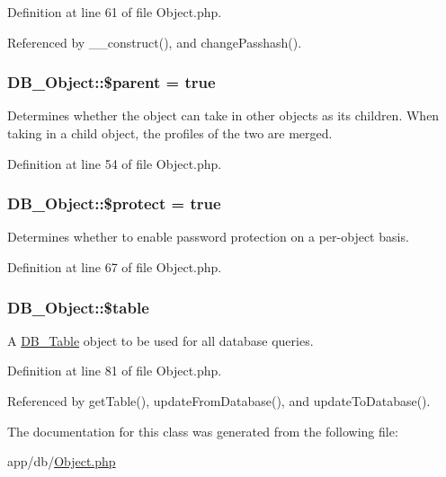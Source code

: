 Definition at line 61 of file Object.php.

Referenced by \_\-\_\-construct(), and changePasshash().\hypertarget{classDB__Object_abc24dbdab0d6a65f2f775ae46d0c4a59}{
\subsubsection[{\$parent}]{\setlength{\rightskip}{0pt plus 5cm}DB\_\-Object::\$parent = true}}
\label{dc/d6d/classDB__Object_abc24dbdab0d6a65f2f775ae46d0c4a59}
Determines whether the object can take in other objects as its children. When taking in a child object, the profiles of the two are merged. 

Definition at line 54 of file Object.php.\hypertarget{classDB__Object_ae7ffc7d66d72066f8333048851ef6926}{
\subsubsection[{\$protect}]{\setlength{\rightskip}{0pt plus 5cm}DB\_\-Object::\$protect = true}}
\label{dc/d6d/classDB__Object_ae7ffc7d66d72066f8333048851ef6926}
Determines whether to enable password protection on a per-\/object basis. 

Definition at line 67 of file Object.php.\hypertarget{classDB__Object_a0d08820dae7ab434119115781b369714}{
\subsubsection[{\$table}]{\setlength{\rightskip}{0pt plus 5cm}DB\_\-Object::\$table}}
\label{dc/d6d/classDB__Object_a0d08820dae7ab434119115781b369714}
A \hyperlink{classDB__Table}{DB\_\-Table} object to be used for all database queries. 

Definition at line 81 of file Object.php.

Referenced by getTable(), updateFromDatabase(), and updateToDatabase().

The documentation for this class was generated from the following file:\begin{DoxyCompactItemize}
\item 
app/db/\hyperlink{Object_8php}{Object.php}\end{DoxyCompactItemize}
